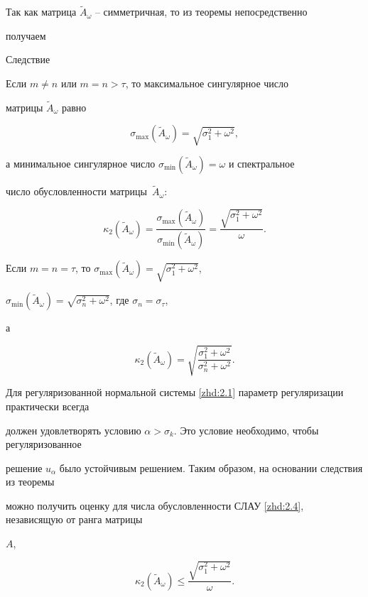 Так как матрица $\tilde A_\omega$ -- симметричная, то из теоремы непосредственно

получаем



\begin{newthm}{Следствие}

Если $m\neq n$ или $m=n>\tau$, то максимальное сингулярное число

матрицы $\tilde A_\omega$ равно

$$ \sigma_{\max}(\tilde A_\omega)=\sqrt{\sigma_1^2+\omega^2}, $$

а минимальное сингулярное число $\sigma_{\min}(\tilde A_\omega)=\omega$ и спектральное

число обусловленности матрицы~$\tilde A_\omega$:

$$ \kappa_2(\tilde A_\omega)=\frac{\sigma_{\max}(\tilde A_\omega)}

   {\sigma_{\min}(\tilde A_\omega)}=\frac{\sqrt{\sigma_1^2+\omega^2}}{\omega}.

$$

Если $m=n=\tau$, то $\sigma_{\max}(\tilde A_\omega)=\sqrt{\sigma_1^2+\omega^2}$,

$\sigma_{\min}(\tilde A_\omega)=\sqrt{\sigma_n^2+\omega^2}$, где $\sigma_n=\sigma_\tau$,

а

$$ \kappa_2(\tilde A_\omega)=\sqrt{\frac{\sigma_1^2+\omega^2}{\sigma_n^2+\omega^2}}. $$

\end{newthm}



Для регуляризованной нормальной системы \eqref{zhd:2.1} параметр регуляризации практически всегда

должен удовлетворять условию $\alpha>\sigma_k$. Это условие необходимо, чтобы регуляризованное

решение $u_\alpha$ было устойчивым решением. Таким образом, на основании следствия из теоремы

можно получить оценку для числа обусловленности СЛАУ \eqref{zhd:2.4}, независящую от ранга матрицы

$A$,

\begin{equation}\label{zhd:2.7}

    \kappa_2(\tilde A_\omega) \leq \frac{\sqrt{\sigma_1^2+\omega^2}}{\omega}.

\end{equation}



